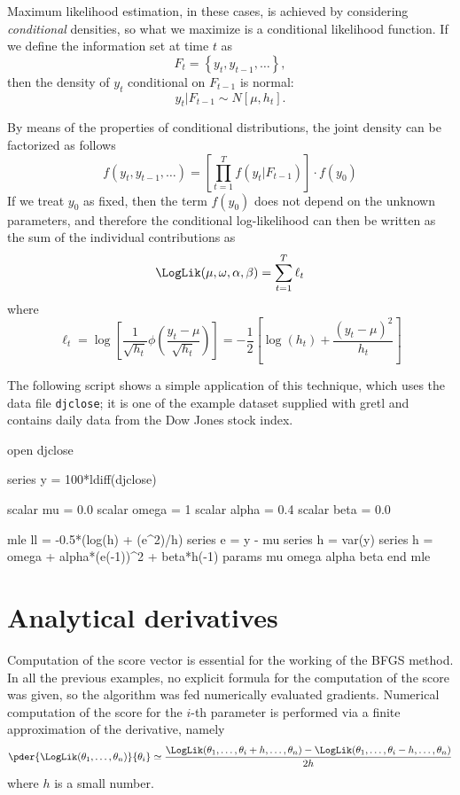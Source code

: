Maximum likelihood estimation, in these cases, is achieved by
considering \emph{conditional} densities, so what we maximize is a
conditional likelihood function. If we define the information set at
time $t$ as
\[
  F_t = \left\{ y_t, y_{t-1}, \ldots \right\} ,
\]
then the density of $y_t$ conditional on $F_{t-1}$ is normal:
\[
  y_t | F_{t-1} \sim N\left[ \mu, h_{t} \right].
\]

By means of the properties of conditional distributions, the joint
density can be factorized as follows
\[
  f(y_t, y_{t-1}, \ldots) = \left[ \prod_{t=1}^T f(y_t |F_{t-1})
  \right] \cdot f(y_0)
\]
If we treat $y_0$ as fixed, then the term $f(y_0)$ does not depend on
the unknown parameters, and therefore the conditional log-likelihood
can then be written as the sum of the individual contributions as
\begin{equation}
  \label{eq:garchloglik}
  \LogLik(\mu,\omega,\alpha,\beta) = \sum_{t=1}^T \ell_t
\end{equation}
where 
\[
  \ell_t = \log \left[ \frac{1}{\sqrt{h_t}} \phi\left( \frac{y_t - \mu}{\sqrt{h_t}}
    \right) \right] = 
    - \frac{1}{2} \left[ \log(h_t) + \frac{(y_t - \mu)^2}{h_t} \right]
\]

The following script shows a simple application of this technique,
which uses the data file \texttt{djclose}; it is one of the example
dataset supplied with gretl and contains daily data from the Dow Jones
stock index.

\begin{code}
open djclose

series y = 100*ldiff(djclose)

scalar mu = 0.0
scalar omega = 1
scalar alpha = 0.4
scalar beta = 0.0

mle ll = -0.5*(log(h) + (e^2)/h)
  series e = y - mu
  series h = var(y)
  series h = omega + alpha*(e(-1))^2 + beta*h(-1)
  params mu omega alpha beta
end mle
\end{code}

\section{Analytical derivatives}
\label{sec:anal-der}

Computation of the score vector is essential for the working of the
BFGS method. In all the previous examples, no explicit formula for the
computation of the score was given, so the algorithm was fed
numerically evaluated gradients. Numerical computation of the score for
the $i$-th parameter is performed via a finite approximation of the
derivative, namely
\[
  \pder{\LogLik(\theta_1, \ldots, \theta_n)}{\theta_i} \simeq 
  \frac{\LogLik(\theta_1, \ldots, \theta_i + h, \ldots, \theta_n) -
    \LogLik(\theta_1, \ldots, \theta_i - h, \ldots, \theta_n)}{2h}
\]
where $h$ is a small number. 

